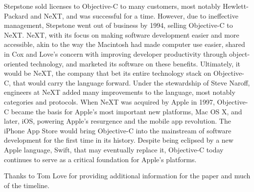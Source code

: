 \documentclass[acmsmall,screen]{acmart}
\begin{document}
Stepstone sold licenses to Objective-C to many customers, most notably Hewlett-Packard and NeXT, and was successful for a time. However, due to ineffective management, Stepstone went out of business by 1994, selling Objective-C to NeXT. NeXT, with its focus on making software development easier and more accessible, akin to the way the Macintosh had made computer use easier, shared in Cox and Love's concern with improving developer productivity through object-oriented technology, and marketed its software on these benefits. Ultimately, it would be NeXT, the company that bet its entire technology stack on Objective-C, that would carry the language forward. Under the stewardship of Steve Naroff, engineers at NeXT added many improvements to the language, most notably categories and protocols. When NeXT was acquired by Apple in 1997, Objective-C became the basis for Apple's most important new platforms, Mac OS X, and later, iOS, powering Apple's resurgence and the mobile app revolution. The iPhone App Store would bring Objective-C into the mainstream of software development for the first time in its history. Despite being eclipsed by a new Apple language, Swift, that may eventually replace it, Objective-C today continues to serve as a critical foundation for Apple's platforms.

\begin{acks}                            %
Thanks to Tom Love for providing additional information for the paper and much of the timeline.
\end{acks}

\appendix
\end{document}
